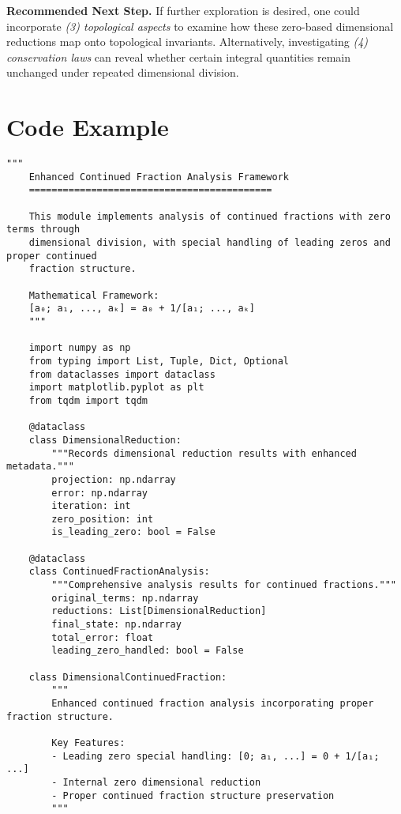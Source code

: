 \bigskip
\noindent
\textbf{Recommended Next Step.}
If further exploration is desired, one could incorporate \emph{(3) topological aspects} to examine how these zero-based dimensional reductions map onto topological invariants. Alternatively, investigating \emph{(4) conservation laws} can reveal whether certain integral quantities remain unchanged under repeated dimensional division.

\appendix
\section{Code Example}
\label{appendix:code}

\lstset{language=Python,basicstyle=\ttfamily\small,breaklines=true}
\begin{lstlisting}[caption={Enhanced Continued Fraction Analysis Framework},label={lst:analysis-code}]
    """
    Enhanced Continued Fraction Analysis Framework
    ===========================================
    
    This module implements analysis of continued fractions with zero terms through
    dimensional division, with special handling of leading zeros and proper continued
    fraction structure.
    
    Mathematical Framework:
    [a₀; a₁, ..., aₖ] = a₀ + 1/[a₁; ..., aₖ]
    """
    
    import numpy as np
    from typing import List, Tuple, Dict, Optional
    from dataclasses import dataclass
    import matplotlib.pyplot as plt
    from tqdm import tqdm
    
    @dataclass
    class DimensionalReduction:
        """Records dimensional reduction results with enhanced metadata."""
        projection: np.ndarray
        error: np.ndarray
        iteration: int
        zero_position: int
        is_leading_zero: bool = False
    
    @dataclass
    class ContinuedFractionAnalysis:
        """Comprehensive analysis results for continued fractions."""
        original_terms: np.ndarray
        reductions: List[DimensionalReduction]
        final_state: np.ndarray
        total_error: float
        leading_zero_handled: bool = False
    
    class DimensionalContinuedFraction:
        """
        Enhanced continued fraction analysis incorporating proper fraction structure.
        
        Key Features:
        - Leading zero special handling: [0; a₁, ...] = 0 + 1/[a₁; ...]
        - Internal zero dimensional reduction
        - Proper continued fraction structure preservation
        """
        

\end{lstlisting}
